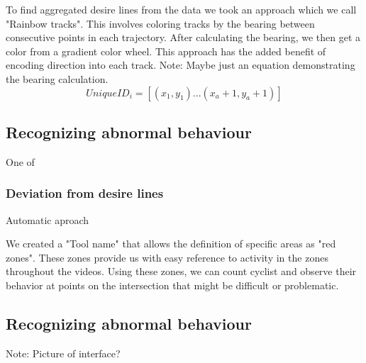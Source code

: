 To find aggregated desire lines from the data we took an approach which we call "Rainbow tracks". This involves coloring tracks by the bearing between consecutive points in each trajectory. After calculating the bearing, we then get a color from a gradient color wheel. This approach has the added benefit of encoding direction into 
each track.
Note: Maybe just an equation demonstrating the bearing calculation.
\ \\ 

\begin{equation}
  UniqueID_i = [(x_1, y_1)...(x_a+1, y_a+1)]\label{eq:3}
\end{equation}

\subsection{Recognizing abnormal behaviour}

One of
\subsubsection{Deviation from desire lines}
Automatic aproach


\color{red}
We created a "Tool name" that allows the definition of specific areas as "red zones". These zones provide us with easy reference to activity in the zones throughout the videos.
Using these zones, we can count cyclist and observe their behavior at points on the intersection that might be difficult or
problematic.

\subsection{Recognizing abnormal behaviour}

Note: Picture of interface?
